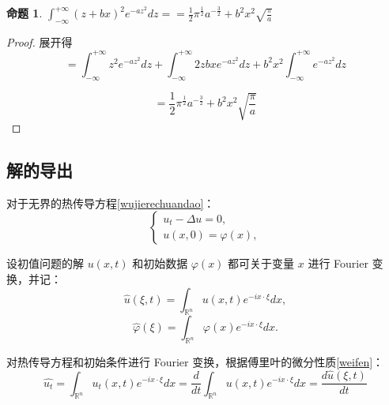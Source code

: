 \documentclass[12pt,a4paper]{article}
\numberwithin{subsection}{section}   %
\numberwithin{subsubsection}{subsection}
\theoremstyle{plain}
\theoremstyle{definition}
\newtheorem{example}{命题}[subsection]  %
\theoremstyle{remark}
\theoremstyle{remark}
\begin{document}
	
	
	\begin{example}\label{ex:5}
		$	\int_{-\infty}^{+\infty} (z + bx)^2 e^{-a z^2} dz=	= \frac{1}{2} \pi^{\frac{1}{2}} a^{-\frac{3}{2}} + b^2 x^2 \sqrt{\frac{\pi}{a}}$
	\end{example}
	
	\begin{proof}
		展开得
		\begin{equation*}
			= \int_{-\infty}^{+\infty} z^2 e^{-a z^2} dz + \int_{-\infty}^{+\infty} 2 z b x e^{-a z^2} dz + b^2 x^2 \int_{-\infty}^{+\infty} e^{-a z^2} dz
		\end{equation*}
		
		\begin{equation*}
			= \frac{1}{2} \pi^{\frac{1}{2}} a^{-\frac{3}{2}} + b^2 x^2 \sqrt{\frac{\pi}{a}}
		\end{equation*}
		
	\end{proof}
	
	
	
	
	
	
	
	
	\subsection{解的导出}
	对于无界的热传导方程\eqref{wujierechuandao}：
	\begin{equation}
		\begin{cases}
			u_t - \Delta u = 0, \\
			u(x, 0) = \varphi(x),
		\end{cases}
	\end{equation}
	
	设初值问题的解 \( u(x, t) \) 和初始数据 \( \varphi(x) \) 都可关于变量 \( x \) 进行 Fourier 变换，并记：
	\begin{equation}
		\hat{u}(\xi, t) = \int_{\mathbb{R}^n} u(x, t) e^{-i x \cdot \xi} dx,
	\end{equation}
	\begin{equation}
		\hat{\varphi}(\xi) = \int_{\mathbb{R}^n} \varphi(x) e^{-i x \cdot \xi} dx.
	\end{equation}
	
	对热传导方程和初始条件进行 Fourier 变换，根据傅里叶的微分性质\eqref{weifen}：
		\begin{equation}
	\hat{u_t}=\int_{\mathbb{R}^n} u_t(x, t) e^{-i x \cdot \xi} dx=\frac{d}{dt} \int_{\mathbb{R}^n} u(x, t) e^{-i x \cdot \xi} dx= \frac{d\hat{u}(\xi, t)}{dt}
		\end{equation}
	
\end{document}
